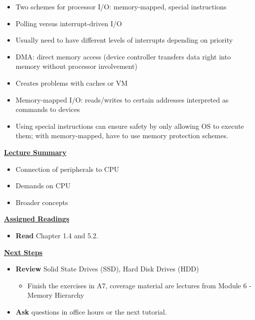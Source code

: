 \begin{frame}[fragile]
\begin{itemize}
\item Two schemes for processor I/O: memory-mapped, special instructions
\item Polling versus interrupt-driven I/O
\item Usually need to have different levels of interrupts depending on
priority
\item DMA: direct memory access (device controller transfers data
right into memory without processor involvement)
\item Creates problems with caches or VM
\end{itemize}
\BNotes\ifnum{}
\begin{itemize}
\item Memory-mapped I/O: reads/writes to certain addresses interpreted as
commands to devices
\item Using special instructions can ensure safety by only allowing OS
to execute them; with memory-mapped, have to use memory protection schemes.
\end{itemize}
\fi\ENotes
\end{frame}

\begin{frame}[fragile]
 \underline{\textbf{Lecture Summary}}
 \begin{itemize}
 \item Connection of peripherals to CPU
          \item Demands on CPU
          \item Broader concepts 
\end{itemize}

 \underline{\textbf{Assigned Readings}}
\begin{itemize}
   \item \textbf{Read} Chapter 1.4 and 5.2.
     \end{itemize}
    \underline{\textbf{Next Steps}}
    \begin{itemize}
     \item \textbf{Review} Solid State Drives (SSD), Hard Disk Drives (HDD)
\begin{itemize}
    \item Finish the exercises in A7, coverage material are lectures from Module 6 - Memory Hierarchy
\end{itemize}
    \item \textbf{Ask} questions in office hours or the next tutorial.
 \end{itemize}

\end{frame}

